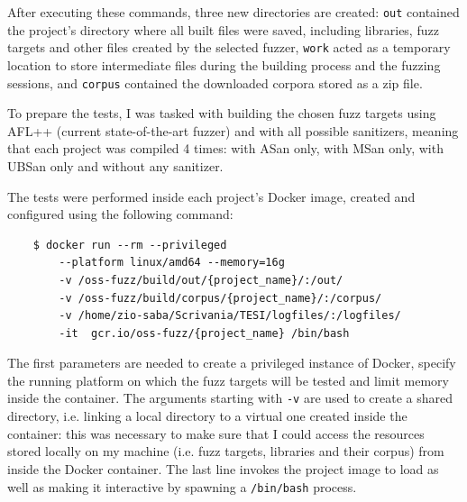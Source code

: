After executing these commands, three new directories are created: \verb|out| contained the project's directory where all built files were saved, including libraries, fuzz targets and other files created by the selected fuzzer, \verb|work| acted as a temporary location to store intermediate files during the building process and the fuzzing sessions, and \verb|corpus| contained the downloaded corpora stored as a zip file.

To prepare the tests, I was tasked with building the chosen fuzz targets using AFL++ (current state-of-the-art fuzzer) and with all possible sanitizers, meaning that each project was compiled 4 times: with ASan only, with MSan only, with UBSan only and without any sanitizer.

The tests were performed inside each project's Docker image, created and configured using the following command:

\begin{verbatim}
    $ docker run --rm --privileged 
        --platform linux/amd64 --memory=16g 
        -v /oss-fuzz/build/out/{project_name}/:/out/
        -v /oss-fuzz/build/corpus/{project_name}/:/corpus/    
        -v /home/zio-saba/Scrivania/TESI/logfiles/:/logfiles/ 
        -it  gcr.io/oss-fuzz/{project_name} /bin/bash
\end{verbatim}

The first parameters are needed to create a privileged instance of Docker, specify the running platform on which the fuzz targets will be tested and limit memory inside the container. The arguments starting with \verb|-v| are used to create a shared directory, i.e. linking a local directory to a virtual one created inside the container: this was necessary to make sure that I could access the resources stored locally on my machine (i.e. fuzz targets, libraries and their corpus) from inside the Docker container. The last line invokes the project image to load as well as making it interactive by spawning a \verb|/bin/bash| process.
\ \\

